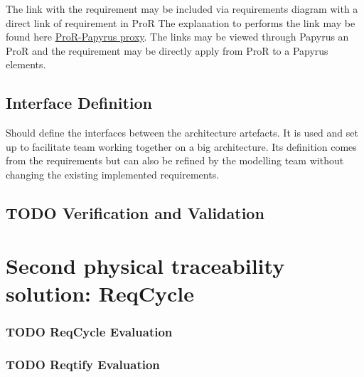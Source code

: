 \documentclass[11pt]{template/openetcs_report}
\begin{document}
The link with the requirement may be included via requirements diagram with a
direct link of requirement in ProR
The explanation to performs the link may be found here \href{https://github.com/openETCS/toolchain/wiki/User-Documentation#tracing-requirements-and-sysml-models}{ProR-Papyrus proxy}.
The links may be viewed through Papyrus an ProR and the requirement may be
directly apply from ProR to a Papyrus elements.


\section{Interface Definition}
\label{sec-9}

Should define the interfaces between the architecture artefacts.  It is used and
set up to facilitate team working together on a big architecture. Its definition
comes from the requirements but can also be refined by the modelling team without
changing the existing implemented requirements.



\section{{\bfseries\sffamily TODO} Verification and Validation}
\label{sec-11}

\chapter{Second physical traceability solution: ReqCycle}
\label{sec-6}

\subsection{{\bfseries\sffamily TODO} ReqCycle  Evaluation}
\label{sec-4-5}
\subsection{{\bfseries\sffamily TODO} Reqtify Evaluation}
\label{sec-4-6}






\end{document}
